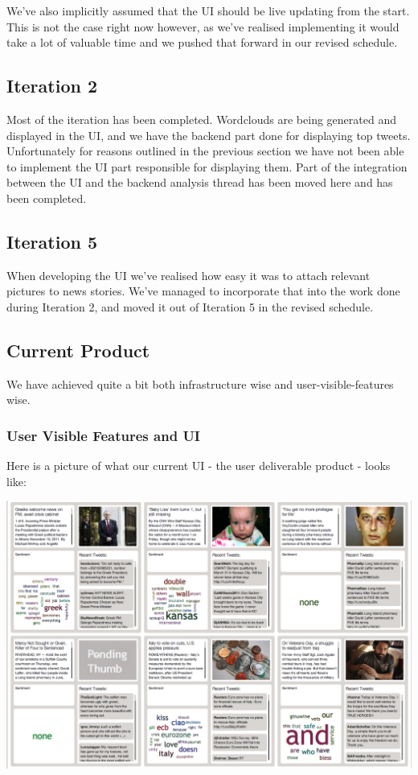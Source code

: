 \documentclass[a4paper,12pt]{article}
\begin{document}
	We've also implicitly assumed that the UI should be live updating from the start. This is not the case right now however, as we've realised implementing it would take a lot of valuable time and we pushed that forward in our revised schedule.
	
	\subsection{Iteration 2}
	Most of the iteration has been completed. Wordclouds are being generated and displayed in the UI, and we have the backend part done for displaying top tweets. Unfortunately for reasons outlined in the previous section we have not been able to implement the UI part responsible for displaying them. Part of the integration between the UI and the backend analysis thread has been moved here and has been completed.
	
	\subsection{Iteration 5}
	When developing the UI we've realised how easy it was to attach relevant pictures to news stories. We've managed to incorporate that into the work done during Iteration 2, and moved it out of Iteration 5 in the revised schedule. 
	
	\subsection{Current Product}
	
	We have achieved quite a bit both infrastructure wise and user-visible-features wise.
	
	\subsubsection{User Visible Features and UI}
	
	Here is a picture of what our current UI - the user deliverable product - looks like:
	
	\includegraphics[scale=0.36]{website.png}
	
\end{document}
